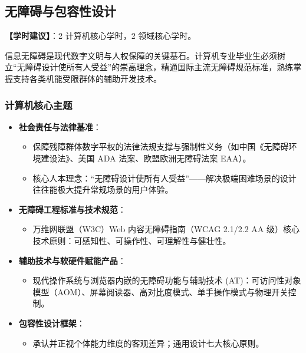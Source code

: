 \subsection{无障碍与包容性设计}
\textbf{【学时建议】}：2 计算机核心学时，2 领域核心学时。

信息无障碍是现代数字文明与人权保障的关键基石。计算机专业毕业生必须树立“无障碍设计使所有人受益”的崇高理念，精通国际主流无障碍规范标准，熟练掌握支持各类机能受限群体的辅助开发技术。

\subsubsection{计算机核心主题}
\begin{itemize}
    \item \textbf{社会责任与法律基准}：
    \begin{itemize}
        \item 保障残障群体数字平权的法律法规支撑与强制性义务（如中国《无障碍环境建设法》、美国 ADA 法案、欧盟欧洲无障碍法案 EAA）。
        \item 核心人本理念：“无障碍设计使所有人受益”——解决极端困难场景的设计往往能极大提升常规场景的用户体验。
    \end{itemize}
    \item \textbf{无障碍工程标准与技术规范}：
    \begin{itemize}
        \item 万维网联盟（W3C）Web 内容无障碍指南（WCAG 2.1/2.2 AA 级）核心技术原则：可感知性、可操作性、可理解性与健壮性。
    \end{itemize}
    \item \textbf{辅助技术与软硬件赋能产品}：
    \begin{itemize}
        \item 现代操作系统与浏览器内嵌的无障碍功能与辅助技术 (AT)：可访问性对象模型（AOM）、屏幕阅读器、高对比度模式、单手操作模式与物理开关控制。
    \end{itemize}
    \item \textbf{包容性设计框架}：
    \begin{itemize}
        \item 承认并正视个体能力维度的客观差异；通用设计七大核心原则。
    \end{itemize}
\end{itemize}

